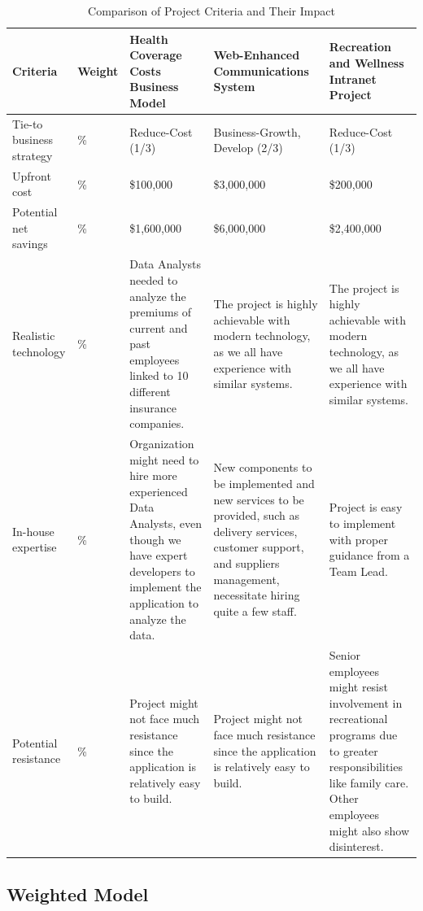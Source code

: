 \begin{table}[h]
    \centering
    \caption{Comparison of Project Criteria and Their Impact}
    \label{tab:project_com}
    \begin{tabularx}{\textwidth}{>{\hsize=0.7\hsize}X>{\hsize=0.5\hsize}X>{\hsize=1.2\hsize}X>{\hsize=1.3\hsize}X>{\hsize=1.3\hsize}X}
    \toprule
    \textbf{Criteria} & \textbf{Weight} & \textbf{Health Coverage Costs Business Model} & \textbf{Web-Enhanced Communications System} & \textbf{Recreation and Wellness Intranet Project} \\
    \midrule
    Tie-to business strategy & 10\% & Reduce-Cost (1/3) & Business-Growth, Develop (2/3) & Reduce-Cost (1/3) \\
    Upfront cost & 25\% & \$100,000 & \$3,000,000 & \$200,000 \\
    Potential net savings & 25\% & \$1,600,000 & \$6,000,000 & \$2,400,000 \\
    Realistic technology & 15\% & Data Analysts needed to analyze the premiums of current and past employees linked to 10 different insurance companies. & The project is highly achievable with modern technology, as we all have experience with similar systems. & The project is highly achievable with modern technology, as we all have experience with similar systems. \\
    In-house expertise & 10\% & Organization might need to hire more experienced Data Analysts, even though we have expert developers to implement the application to analyze the data. & New components to be implemented and new services to be provided, such as delivery services, customer support, and suppliers management, necessitate hiring quite a few staff. & Project is easy to implement with proper guidance from a Team Lead. \\
    Potential resistance & 15\% & Project might not face much resistance since the application is relatively easy to build. & Project might not face much resistance since the application is relatively easy to build. & Senior employees might resist involvement in recreational programs due to greater responsibilities like family care. Other employees might also show disinterest. \\
    \bottomrule
    \end{tabularx}
\end{table}

\FloatBarrier

\subsection{Weighted Model} \label{sec:wm}


